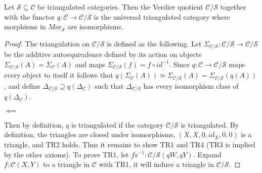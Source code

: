     \begin{theorem}
        Let $\mathcal{S}\subseteq\mathcal{C}$ be triangulated categories. Then the Verdier quotient $\mathcal{C}/\mathcal{S}$ together with the functor $q:\mathcal{C}\rightarrow\mathcal{C}/\mathcal{S}$ is the universal triangulated category where morphisms in $Mor_\mathcal{S}$ are isomorphisms.
    \end{theorem}

    \begin{proof}
        The triangulation on $\mathcal{C}/\mathcal{S}$ is defined as the following. Let $\Sigma_{\mathcal{C/S}}:\mathcal{C}/\mathcal{S}\rightarrow\mathcal{C}/\mathcal{S}$ be the additive autoequivalence defined by its action on objects $\Sigma_{\mathcal{C/S}}(A)=\Sigma_{\mathcal{C}}(A)$ and maps $\Sigma_{\mathcal{C/S}}(f) = f\circ id_{\_}^{-1}$. Since $q:\mathcal{C}\rightarrow\mathcal{C}/\mathcal{S}$ maps every object to itself it follows that $q(\Sigma_{\mathcal{C}}(A)) \simeq \Sigma_{\mathcal{C/S}}(A) = \Sigma_{\mathcal{C/S}}(q(A))$, and define $\Delta_{\mathcal{C}/\mathcal{S}}\supseteq q(\Delta_\mathcal{C})$ such that $\Delta_{\mathcal{C}/\mathcal{S}}$ has every isomorphism class of $q(\Delta_\mathcal{C})$. 
        \begin{center}
            $\impliedby$
        \end{center}
        Then by definition, $q$ is triangulated if the category $\mathcal{C}/\mathcal{S}$ is triangulated.
        By definition, the triangles are closed under isomorphisms, $(X,X,0,id_X,0,0)$ is a triangle, and TR2 holds. Thus it remains to show TR1 and TR4 (TR3 is implied by the other axioms). To prove TR1, let $fs^{-1}:\mathcal{C}/\mathcal{S}(qW,qY)$. Expand $f:\mathcal{C}(X,Y)$ to a triangle in $\mathcal{C}$ with TR1, it will induce a triangle in  $\mathcal{C}/\mathcal{S}$.

\end{proof}
